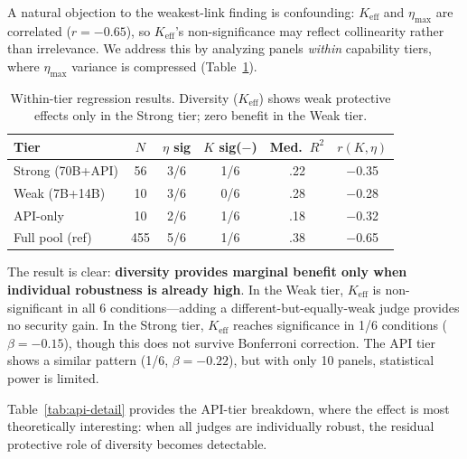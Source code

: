 \documentclass[11pt,a4paper]{article}
\begin{document}
A natural objection to the weakest-link finding is confounding: $K_{\text{eff}}$ and $\eta_{\max}$ are correlated ($r = -0.65$), so $K_{\text{eff}}$'s non-significance may reflect collinearity rather than irrelevance. We address this by analyzing panels \emph{within} capability tiers, where $\eta_{\max}$ variance is compressed (Table~\ref{tab:within-tier}).

\begin{table}[t]
\centering
\small
\caption{Within-tier regression results. Diversity ($K_{\text{eff}}$) shows weak protective effects only in the Strong tier; zero benefit in the Weak tier.}
\label{tab:within-tier}
\begin{tabular}{@{}lccccc@{}}
\toprule
Tier & $N$ & $\eta$ sig & $K$ sig($-$) & Med.\ $R^2$ & $r(K, \eta)$ \\
\midrule
Strong (70B+API) & 56  & 3/6 & 1/6 & .22 & $-$0.35 \\
Weak (7B+14B)    & 10  & 3/6 & 0/6 & .28 & $-$0.28 \\
API-only         & 10  & 2/6 & 1/6 & .18 & $-$0.32 \\
Full pool (ref)  & 455 & 5/6 & 1/6 & .38 & $-$0.65 \\
\bottomrule
\end{tabular}
\vspace{-2mm}
\end{table}

The result is clear: \textbf{diversity provides marginal benefit only when individual robustness is already high}. In the Weak tier, $K_{\text{eff}}$ is non-significant in all 6 conditions---adding a different-but-equally-weak judge provides no security gain. In the Strong tier, $K_{\text{eff}}$ reaches significance in 1/6 conditions ($\beta = -0.15$), though this does not survive Bonferroni correction. The API tier shows a similar pattern (1/6, $\beta = -0.22$), but with only 10 panels, statistical power is limited.

Table~\ref{tab:api-detail} provides the API-tier breakdown, where the effect is most theoretically interesting: when all judges are individually robust, the residual protective role of diversity becomes detectable.
\end{document}

